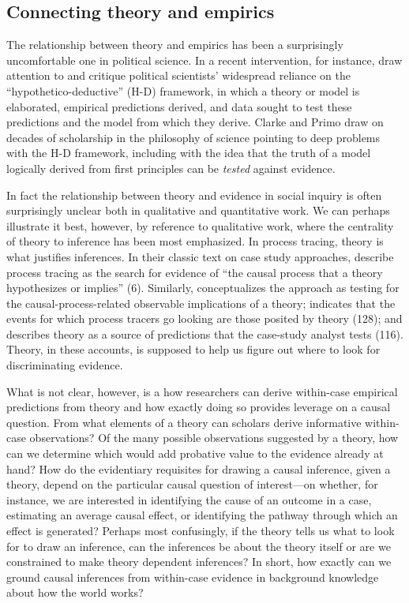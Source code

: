 \documentclass[
  12pt,
]{book}
\begin{document}
\hypertarget{connecting-theory-and-empirics}{%
\subsection{Connecting theory and empirics}\label{connecting-theory-and-empirics}}

The relationship between theory and empirics has been a surprisingly uncomfortable one in political science. In a recent intervention, for instance, \citet{clarke2012model} draw attention to and critique political scientists' widespread reliance on the ``hypothetico-deductive'' (H-D) framework, in which a theory or model is elaborated, empirical predictions derived, and data sought to test these predictions and the model from which they derive. Clarke and Primo draw on decades of scholarship in the philosophy of science pointing to deep problems with the H-D framework, including with the idea that the truth of a model logically derived from first principles can be \emph{tested} against evidence.

In fact the relationship between theory and evidence in social inquiry is often surprisingly unclear both in qualitative and quantitative work. We can perhaps illustrate it best, however, by reference to qualitative work, where the centrality of theory to inference has been most emphasized. In process tracing, theory is what justifies inferences. In their classic text on case study approaches, \citet{george2005case} describe process tracing as the search for evidence of ``the causal process that a theory hypothesizes or implies'' (6). Similarly, \citet{Hall2003aligning} conceptualizes the approach as testing for the causal-process-related observable implications of a theory; \citet{mahoney2010after} indicates that the events for which process tracers go looking are those posited by theory (128); and \citet{gerring2006case} describes theory as a source of predictions that the case-study analyst tests (116). Theory, in these accounts, is supposed to help us figure out where to look for discriminating evidence.

What is not clear, however, is a how researchers can derive within-case empirical predictions from theory and how exactly doing so provides leverage on a causal question. From what elements of a theory can scholars derive informative within-case observations?
Of the many possible observations suggested by a theory, how can we determine which would add probative value to the evidence already at hand? How do the evidentiary requisites for drawing a causal inference, given a theory, depend on the particular causal question of interest---on whether, for instance, we are interested in identifying the cause of an outcome in a case, estimating an average causal effect, or identifying the pathway through which an effect is generated? Perhaps most confusingly, if the theory tells us what to look for to draw an inference, can the inferences be about the theory itself or are we constrained to make theory dependent inferences?
In short, how exactly can we ground causal inferences from within-case evidence in background knowledge about how the world works?
\end{document}
